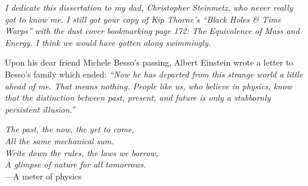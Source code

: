 {
\itshape
I dedicate this dissertation to my dad, Christopher Steinmetz, who never really got to know me. I still got your copy of Kip Thorne's ``Black Holes \& Time Warps'' with the dust cover bookmarking page 172: The Equivalence of Mass and Energy. I think we would have gotten along swimmingly.
}

\vfill

{
\noindent Upon his dear friend Michele Besso's passing, Albert Einstein wrote a letter to Besso's family which ended:
\centering\itshape
``Now he has departed from this strange world a little ahead of me. That means nothing. People like us, who believe in physics, know that the distinction between past, present, and future is only a stubbornly persistent illusion.''
}

\vfill

{
\centering\emph{
    The past, the now, the yet to come,\\
    All the same mechanical sum.\\
    Write down the rules, the laws we borrow,\\
    A glimpse of nature for all tomorrows.\\
}
---A meter of physics\,\\
}


